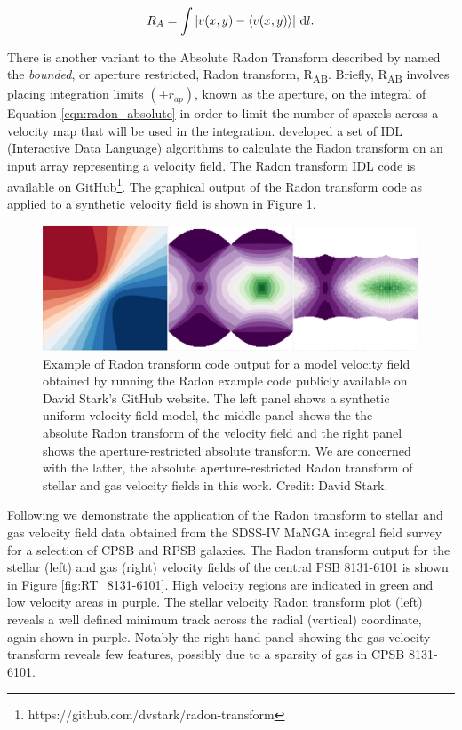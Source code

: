 \begin{equation}
    \label{eqn:radon_absolute}
    R_A=\int{| v(x,y) - \langle v(x,y) \rangle | \, \mathop{}\!\mathrm{d}l}.
\end{equation}

There is another variant to the Absolute Radon Transform described by \citet{2018MNRAS.480.2217S} named the \textit{bounded}, or aperture restricted, Radon transform, R\textsubscript{AB}. Briefly, R\textsubscript{AB} involves placing integration limits $(\pm{r_{ap}})$, known as the aperture, on the integral of Equation \ref{eqn:radon_absolute} in order to limit the number of spaxels across a velocity map that will be used in the integration. \citet{2018MNRAS.480.2217S} developed a set of IDL (Interactive Data Language) algorithms to calculate the Radon transform on an input array representing a velocity field. The Radon transform IDL code is available on GitHub\footnote{https://github.com/dvstark/radon-transform}. 
The graphical output of the Radon transform code as applied to a synthetic velocity field is shown in Figure \ref{fig:Radon}.

\begin{figure}
    \centering
   	\includegraphics[width=\columnwidth]{images/RadonPlots/example.png}
    \caption[Model velocity field Radon transform plots]{Example of Radon transform code output for a model velocity field obtained by running the Radon example code publicly available on David Stark's GitHub website. The left panel shows a synthetic uniform velocity field model, the middle panel shows the the absolute Radon transform of the velocity field and the right panel shows the aperture-restricted absolute transform. We are concerned with the latter, the absolute aperture-restricted Radon transform of stellar and gas velocity fields in this work. Credit: David Stark.}
    \label{fig:Radon}
\end{figure}

Following \citet{2018MNRAS.480.2217S} we demonstrate the application of the Radon transform to stellar and gas velocity field data obtained from the SDSS-IV MaNGA integral field survey for a selection of CPSB and RPSB galaxies. The Radon transform output for the stellar (left) and gas (right) velocity fields of the central PSB 8131-6101 is shown in Figure \ref{fig:RT_8131-6101}. High velocity regions are indicated in green and low velocity areas in purple. The stellar velocity Radon transform plot (left) reveals a well defined minimum track across the radial (vertical) coordinate, again shown in purple. Notably the right hand panel showing the gas velocity transform reveals few features, possibly due to a sparsity of gas in CPSB 8131-6101.

